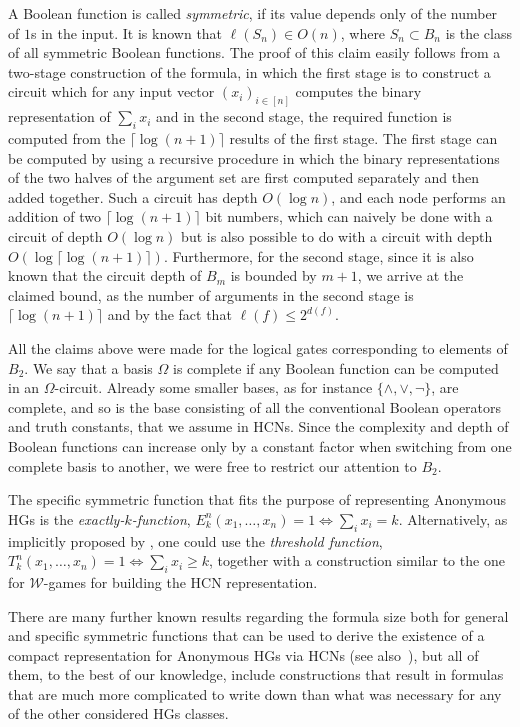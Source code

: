 \documentclass[letterpaper]{article} %
\newcommand{\W}{\ensuremath{\mathcal{W}}}
\begin{document}
A Boolean function is called \emph{symmetric}, if its value depends only of the number of $1$s in the input. It is known that $\ell(S_n)\in O(n)$, where $S_n\subset B_n$ is the class of all symmetric Boolean functions. The proof of this claim easily follows from a two-stage construction of the formula, in which the first stage is to construct a circuit which for any input vector $(x_i)_{i\in[n]}$ computes the binary representation of $\sum_i x_i$ and in the second stage, the required function is computed from the $\lceil \log (n+1) \rceil$ results of the first stage.
The first stage can be computed by using a recursive procedure in which the binary representations of the two halves of the argument set are first computed separately and then added together. Such a circuit has depth $O(\log n)$, and each node performs an addition of two $\lceil \log (n+1) \rceil$ bit numbers, which can naively be done with a circuit of depth $O(\log n)$ but is also possible to do with a circuit with depth $O(\log \lceil \log (n+1) \rceil)$. Furthermore, for the second stage, since it is also known that the circuit depth of $B_m$ is bounded by $m+1$, we arrive at the claimed bound, as the number of arguments in the second stage is $\lceil \log (n+1) \rceil$ and by the fact that $\ell(f)\le 2^{d(f)}$.

All the claims above were made for the logical gates corresponding to elements of $B_2$. We say that a basis $\Omega$ is complete if any Boolean function can be computed in an $\Omega$-circuit. Already some smaller bases, as for instance $\{\land, \lor, \lnot\}$, are complete, and so is the base consisting of all the conventional Boolean operators and truth constants, that we assume in HCNs.  Since the complexity and depth of Boolean functions can increase only by a constant factor when switching from one complete basis to another, we were free to restrict our attention to $B_2$.

The specific symmetric function that fits the purpose of representing Anonymous HGs is the \emph{exactly-$k$-function}, $E_k^n(x_1,\dots, x_n)=1 \iff \sum_i x_i=k$. Alternatively, as implicitly proposed by \citet{Elkind09}, one could use the \emph{threshold function}, $T_k^n(x_1,\dots, x_n)=1 \iff \sum_i x_i\ge k$, together with a construction similar to the one for $\W$-games for building the HCN representation.

There are many further known results regarding the formula size both for general and specific symmetric functions that can be used to derive the existence of a compact representation for Anonymous HGs via HCNs (see also~\citet{Dunne}), but all of them, to the best of our knowledge, include constructions that result in formulas that are much more complicated to write down than what was necessary for any of the other considered HGs classes.
\end{document}
